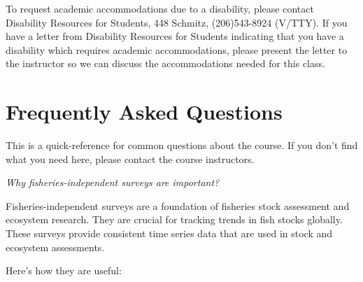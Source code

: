 \documentclass[
  letterpaper,
  oneside,
  open=any]{scrbook}
\begin{document}
To request academic accommodations due to a disability, please contact
Disability Resources for Students, 448 Schmitz, (206)543-8924 (V/TTY).
If you have a letter from Disability Resources for Students indicating
that you have a disability which requires academic accommodations,
please present the letter to the instructor so we can discuss the
accommodations needed for this class.


\chapter{Frequently Asked Questions}\label{frequently-asked-questions}

This is a quick-reference for common questions about the course. If you
don't find what you need here, please contact the course instructors.

\emph{Why fisheries-independent surveys are important?}

Fisheries-independent surveys are a foundation of fisheries stock
assessment and ecosystem research. They are crucial for tracking trends
in fish stocks globally. These surveys provide consistent time series
data that are used in stock and ecosystem assessments.

Here's how they are useful:
\end{document}
